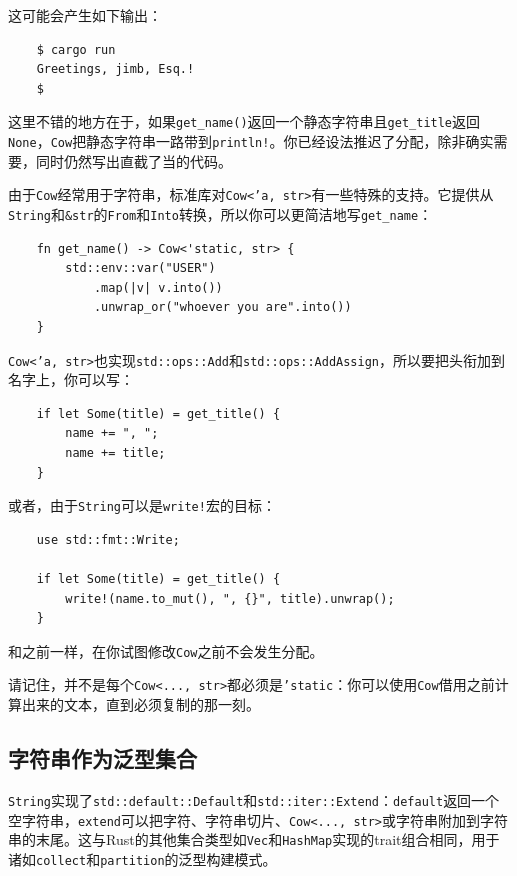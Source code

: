 这可能会产生如下输出：
\begin{verbatim}
    $ cargo run
    Greetings, jimb, Esq.!
    $
\end{verbatim}

这里不错的地方在于，如果\texttt{get\_name()}返回一个静态字符串且\texttt{get\_title}返回\texttt{None}，\texttt{Cow}把静态字符串一路带到\texttt{println!}。你已经设法推迟了分配，除非确实需要，同时仍然写出直截了当的代码。

由于\texttt{Cow}经常用于字符串，标准库对\texttt{Cow<'a, str>}有一些特殊的支持。它提供从\texttt{String}和\texttt{\&str}的\texttt{From}和\texttt{Into}转换，所以你可以更简洁地写\texttt{get\_name}：
\begin{verbatim}
    fn get_name() -> Cow<'static, str> {
        std::env::var("USER")
            .map(|v| v.into())
            .unwrap_or("whoever you are".into())
    }
\end{verbatim}

\texttt{Cow<'a, str>}也实现\texttt{std::ops::Add}和\texttt{std::ops::AddAssign}，所以要把头衔加到名字上，你可以写：
\begin{verbatim}
    if let Some(title) = get_title() {
        name += ", ";
        name += title;
    }
\end{verbatim}

或者，由于\texttt{String}可以是\texttt{write!}宏的目标：
\begin{verbatim}
    use std::fmt::Write;

    if let Some(title) = get_title() {
        write!(name.to_mut(), ", {}", title).unwrap();
    }
\end{verbatim}

和之前一样，在你试图修改\texttt{Cow}之前不会发生分配。

请记住，并不是每个\texttt{Cow<..., str>}都必须是\texttt{'static}：你可以使用\texttt{Cow}借用之前计算出来的文本，直到必须复制的那一刻。

\subsection{字符串作为泛型集合}

\texttt{String}实现了\texttt{std::default::Default}和\texttt{std::iter::Extend}：\texttt{default}返回一个空字符串，\texttt{extend}可以把字符、字符串切片、\texttt{Cow<..., str>}或字符串附加到字符串的末尾。这与Rust的其他集合类型如\texttt{Vec}和\texttt{HashMap}实现的trait组合相同，用于诸如\texttt{collect}和\texttt{partition}的泛型构建模式。


